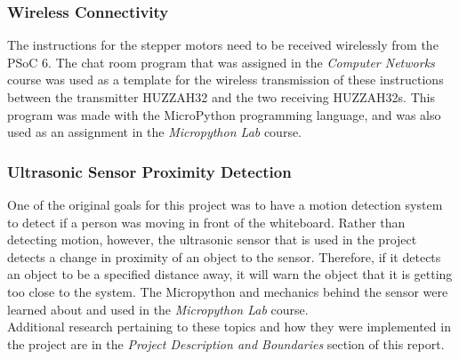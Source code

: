 \subsubsection{Wireless Connectivity}
The instructions for the stepper motors need to be received wirelessly from the PSoC 6. The chat room program that was assigned in the \textit{Computer Networks} course was used as a template for the wireless transmission of these instructions between the transmitter HUZZAH32 and the two receiving HUZZAH32s. This program was made with the MicroPython programming language, and was also used as an assignment in the \textit{Micropython Lab} course.\\

\subsubsection{Ultrasonic Sensor Proximity Detection}
One of the original goals for this project was to have a motion detection system to detect if a person was moving in front of the whiteboard. Rather than detecting motion, however, the ultrasonic sensor that is used in the project detects a change in proximity of an object to the sensor. Therefore, if it detects an object to be a specified distance away, it will warn the object that it is getting too close to the system. The Micropython and mechanics behind the sensor were learned about and used in the \textit{Micropython Lab} course.\\

Additional research pertaining to these topics and how they were implemented in the project are in the \textit{Project Description and Boundaries} section of this report.   

